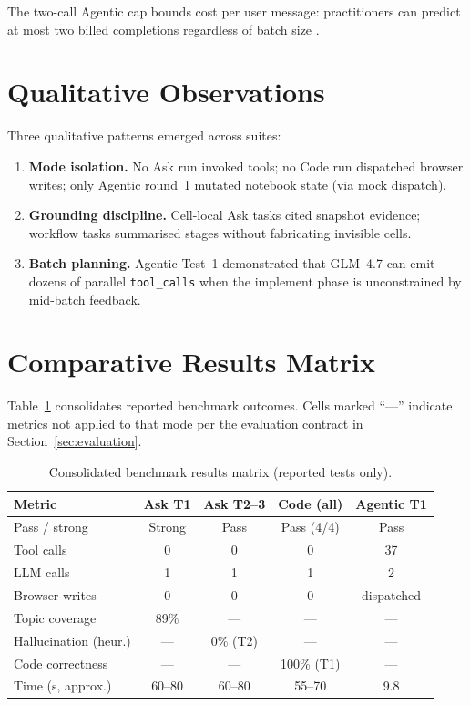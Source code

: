 The two-call Agentic cap bounds cost per user message: practitioners can predict at most two billed completions regardless of batch size \parencite{qin2024toolllm}.

\section{Qualitative Observations}

Three qualitative patterns emerged across suites:

\begin{enumerate}
  \item \textbf{Mode isolation.} No Ask run invoked tools; no Code run dispatched browser writes; only Agentic round~1 mutated notebook state (via mock dispatch).
  \item \textbf{Grounding discipline.} Cell-local Ask tasks cited snapshot evidence; workflow tasks summarised stages without fabricating invisible cells.
  \item \textbf{Batch planning.} Agentic Test~1 demonstrated that GLM~4.7 can emit dozens of parallel \texttt{tool\_calls} when the implement phase is unconstrained by mid-batch feedback.
\end{enumerate}

\section{Comparative Results Matrix}
\label{sec:results-matrix}

Table~\ref{tab:full-matrix} consolidates reported benchmark outcomes. Cells marked ``---'' indicate metrics not applied to that mode per the evaluation contract in Section~\ref{sec:evaluation}.

\begin{table}[!ht]
\centering
\caption{Consolidated benchmark results matrix (reported tests only).}
\label{tab:full-matrix}
\footnotesize
\begin{tabular}{|l|c|c|c|c|}
\hline
\textbf{Metric} & \textbf{Ask T1} & \textbf{Ask T2--3} & \textbf{Code (all)} & \textbf{Agentic T1} \\ \hline
Pass / strong & Strong & Pass & Pass (4/4) & Pass \\ \hline
Tool calls & 0 & 0 & 0 & 37 \\ \hline
LLM calls & 1 & 1 & 1 & 2 \\ \hline
Browser writes & 0 & 0 & 0 & dispatched \\ \hline
Topic coverage & 89\% & --- & --- & --- \\ \hline
Hallucination (heur.) & --- & 0\% (T2) & --- & --- \\ \hline
Code correctness & --- & --- & 100\% (T1) & --- \\ \hline
Time (s, approx.) & 60--80 & 60--80 & 55--70 & 9.8 \\ \hline
\end{tabular}
\end{table}

